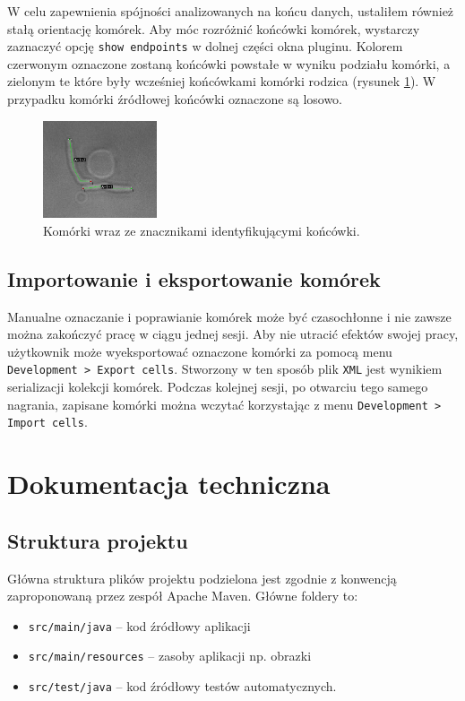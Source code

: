 \documentclass[declaration,shortabstract,mgr]{iithesis}
\begin{document}
W celu zapewnienia spójności analizowanych na końcu danych, ustaliłem również stałą orientację komórek.
Aby móc rozróżnić końcówki komórek, wystarczy zaznaczyć opcję \texttt{show endpoints} w dolnej części okna pluginu.
Kolorem czerwonym oznaczone zostaną końcówki powstałe w wyniku podziału komórki, a zielonym te które były wcześniej końcówkami komórki rodzica (rysunek \ref{fig:ui-show-endpoints}). W przypadku komórki źródłowej końcówki oznaczone są losowo.

\begin{figure}
  \centering
  \includegraphics[width=0.3\textwidth]{images/ui-show-endpoints.png}
  \caption{Komórki wraz ze znacznikami identyfikującymi końcówki.}
  \label{fig:ui-show-endpoints}
\end{figure}

\subsection{Importowanie i eksportowanie komórek}

Manualne oznaczanie i poprawianie komórek może być czasochłonne i nie zawsze można zakończyć pracę w ciągu jednej sesji.
Aby nie utracić efektów swojej pracy, użytkownik może wyeksportować oznaczone komórki za pomocą menu \texttt{Development > Export cells}.
Stworzony w ten sposób plik \texttt{XML} jest wynikiem serializacji kolekcji komórek.
Podczas kolejnej sesji, po otwarciu tego samego nagrania, zapisane komórki można wczytać korzystając z menu \texttt{Development > Import cells}.

\section{Dokumentacja techniczna}

\subsection{Struktura projektu}

Główna struktura plików projektu podzielona jest zgodnie z konwencją zaproponowaną przez zespół Apache Maven\cite{docs:maven-project-layout}. Główne foldery to:
\begin{itemize}
  \item \texttt{src/main/java} -- kod źródłowy aplikacji
  \item \texttt{src/main/resources} -- zasoby aplikacji np. obrazki
  \item \texttt{src/test/java} -- kod źródłowy testów automatycznych.
\end{itemize}
\end{document}
